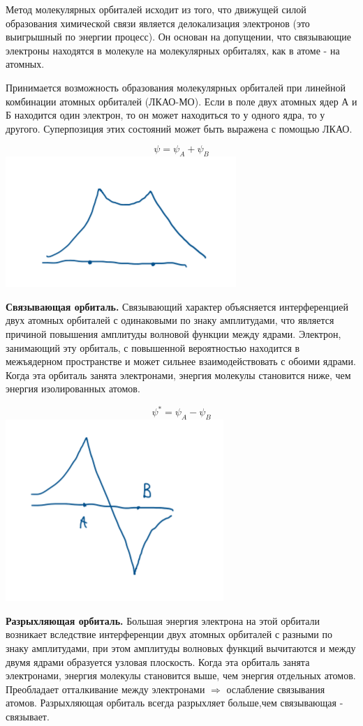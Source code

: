 \documentclass[14pt,a4paper]{scrartcl}
\begin{document}
Метод молекулярных орбиталей исходит из того, что движущей
силой образования химической связи является делокализация
электронов (это выигрышный по энергии процесс). Он основан на
допущении, что связывающие электроны находятся в молекуле на
молекулярных орбиталях, как в атоме - на атомных. 

Принимается возможность образования
молекулярных орбиталей при линейной комбинации атомных
орбиталей (ЛКАО-МО). Если в поле двух атомных ядер А и Б
находится один электрон, то он может находиться то у одного ядра,
то у другого. Суперпозиция этих состояний может быть выражена с
помощью ЛКАО.

$$\psi = \psi_A + \psi_B$$
\includegraphics{3v1.png}

\textbf{Связывающая орбиталь.} Связывающий характер объясняется интерференцией двух атомных
орбиталей с одинаковыми по знаку амплитудами, что является причиной повышения
амплитуды волновой функции между ядрами. Электрон, занимающий эту орбиталь, с
повышенной вероятностью находится в межъядерном пространстве и может сильнее
взаимодействовать с обоими ядрами. Когда эта орбиталь занята электронами, энергия
молекулы становится ниже, чем энергия изолированных атомов.

$$\psi^* = \psi_A - \psi_B$$
\includegraphics{3v2.png}

\textbf{Разрыхляющая орбиталь.} Большая энергия электрона на этой орбитали возникает
вследствие интерференции двух атомных орбиталей с разными по знаку амплитудами, при
этом амплитуды волновых функций вычитаются и между двумя ядрами образуется узловая
плоскость. Когда эта орбиталь занята электронами, энергия молекулы становится выше,
чем энергия отдельных атомов. Преобладает отталкивание между электронами $\Rightarrow$ 
ослабление связывания атомов. Разрыхляющая орбиталь всегда разрыхляет больше,чем
связывающая - связывает.
\end{document}

